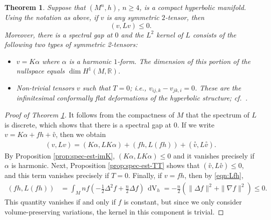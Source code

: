 \documentclass[10pt,reqno]{amsart}
\newtheorem{theorem}{Theorem}[section]
\DeclareMathOperator{\dvol}{dV}
\newcommand{\ttv}{\stackrel{\circ}{v}}
\begin{document}
\begin{theorem} \label{thm:main1c}
Suppose that $(M^n, h)$, $n \geq 4$, is a compact hyperbolic manifold. Using the notation as above, if $v$ is any symmetric $2$-tensor, then 
\begin{equation*}
(v, Lv) \leq 0.
\end{equation*}
Moreover, there is a spectral gap at $0$ and the $L^2$ kernel of $L$ consists of the following two types of symmetric 2-tensors:
\begin{itemize}
\item $v = K \alpha$ where $\alpha$ is a harmonic $1$-form.  The dimension of this portion of the nullspace equals $\dim H^1(M, \mathbb R)$.
\item Non-trivial tensors $v$ such that $T = 0$; i.e., $v_{ij,k} - v_{jk,i} = 0$. These are the infinitesimal conformally flat deformations of the
hyperbolic structure; cf.\ \cite{Lafontaine}.
\end{itemize}
\end{theorem}
\begin{proof}[Proof of Theorem \ref{thm:main1c}] 
It follows from the compactness of $M$ that  the spectrum of $L$ is discrete, which shows that there is a spectral gap at $0$.  If we write $v = K \alpha + f h + \ttv$, then we obtain
\begin{align*} 
(v, Lv) = (K\alpha, L K \alpha) + (f h, L(fh)) + ( \ttv, L\ttv).
\end{align*}
By Proposition \ref{prop:spec-est-imK},  $(K\alpha, LK\alpha) \leq 0$ and it vanishes precisely if $\alpha$ is harmonic.  Next, 
Proposition \ref{prop:spec-est-TT} shows that $( \ttv, L\ttv) \leq 0$, and this term vanishes precisely if $T = 0$.   Finally,
if $v = f h$, then by \eqref{eqn:Lfh}, 
\begin{align*} 
(f h, L(fh)) &=  \int_{M}  n f \left( -\frac{1}{2} \Delta^2 f + \frac{n}{2} \Delta f\right)\, \dvol_h 
= -\frac{n}{2} \left( \| \Delta f \|^2 +  \|\nabla f\|^2\right) \leq 0.
\end{align*}
This quantity vanishes if and only if $f$ is constant, but since we only consider volume-preserving variations, the kernel in this component is trivial.
\end{proof}

\medskip
\end{document}
